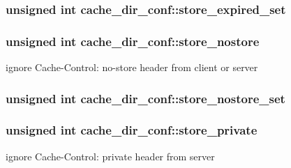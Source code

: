 \subsubsection[{\texorpdfstring{store\+\_\+expired\+\_\+set}{store_expired_set}}]{\setlength{\rightskip}{0pt plus 5cm}unsigned {\bf int} cache\+\_\+dir\+\_\+conf\+::store\+\_\+expired\+\_\+set}\hypertarget{structcache__dir__conf_a7b6536b719dac29dffd807f65ce42e26}{}\label{structcache__dir__conf_a7b6536b719dac29dffd807f65ce42e26}
\subsubsection[{\texorpdfstring{store\+\_\+nostore}{store_nostore}}]{\setlength{\rightskip}{0pt plus 5cm}unsigned {\bf int} cache\+\_\+dir\+\_\+conf\+::store\+\_\+nostore}\hypertarget{structcache__dir__conf_a57eedc1ff72813bae6e611b46a084463}{}\label{structcache__dir__conf_a57eedc1ff72813bae6e611b46a084463}
ignore Cache-\/\+Control\+: no-\/store header from client or server 
\subsubsection[{\texorpdfstring{store\+\_\+nostore\+\_\+set}{store_nostore_set}}]{\setlength{\rightskip}{0pt plus 5cm}unsigned {\bf int} cache\+\_\+dir\+\_\+conf\+::store\+\_\+nostore\+\_\+set}\hypertarget{structcache__dir__conf_a083b196dc344200e3aa9562a72075b05}{}\label{structcache__dir__conf_a083b196dc344200e3aa9562a72075b05}
\subsubsection[{\texorpdfstring{store\+\_\+private}{store_private}}]{\setlength{\rightskip}{0pt plus 5cm}unsigned {\bf int} cache\+\_\+dir\+\_\+conf\+::store\+\_\+private}\hypertarget{structcache__dir__conf_a156a4127edc9cbcb7bbe80a76856e20b}{}\label{structcache__dir__conf_a156a4127edc9cbcb7bbe80a76856e20b}
ignore Cache-\/\+Control\+: private header from server 
